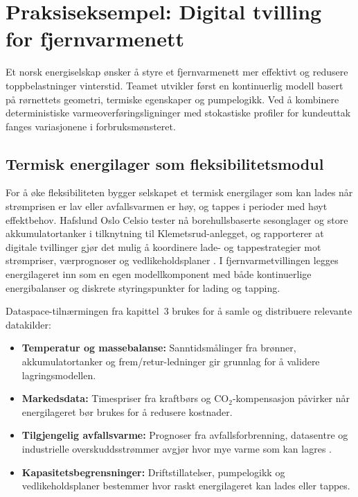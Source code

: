 \section{Praksiseksempel: Digital tvilling for fjernvarmenett}
Et norsk energiselskap ønsker å styre et fjernvarmenett mer effektivt og redusere toppbelastninger vinterstid. Teamet utvikler først en kontinuerlig modell basert på rørnettets geometri, termiske egenskaper og pumpelogikk. Ved å kombinere deterministiske varmeoverføringsligninger med stokastiske profiler for kundeuttak fanges variasjonene i forbruksmønsteret.

\subsection{Termisk energilager som fleksibilitetsmodul}
For å øke fleksibiliteten bygger selskapet et termisk energilager som kan lades når strømprisen er lav eller avfallsvarmen er høy, og tappes i perioder med høyt effektbehov. Hafslund Oslo Celsio tester nå borehullsbaserte sesonglager og store akkumulatortanker i tilknytning til Klemetsrud-anlegget, og rapporterer at digitale tvillinger gjør det mulig å koordinere lade- og tappestrategier mot strømpriser, værprognoser og vedlikeholdsplaner \citep{hafslund2023sesonglager}. I fjernvarmetvillingen legges energilageret inn som en egen modellkomponent med både kontinuerlige energibalanser og diskrete styringspunkter for lading og tapping.

Dataspace-tilnærmingen fra kapittel~3 brukes for å samle og distribuere relevante datakilder:
\begin{itemize}
    \item \textbf{Temperatur og massebalanse:} Sanntidsmålinger fra brønner, akkumulatortanker og frem/retur-ledninger gir grunnlag for å validere lagringsmodellen.
    \item \textbf{Markedsdata:} Timespriser fra kraftbørs og CO$_2$-kompensasjon påvirker når energilageret bør brukes for å redusere kostnader.
    \item \textbf{Tilgjengelig avfallsvarme:} Prognoser fra avfallsforbrenning, datasentre og industrielle overskuddsstrømmer avgjør hvor mye varme som kan lagres \citep{norskfjernvarme2024fleksibilitet}.
    \item \textbf{Kapasitetsbegrensninger:} Driftstillatelser, pumpelogikk og vedlikeholdsplaner bestemmer hvor raskt energilageret kan lades eller tappes.
\end{itemize}

